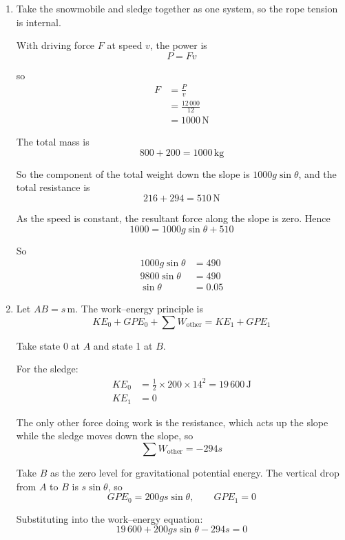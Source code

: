 \documentclass[leqno]{article}
\begin{document}
\begin{enumerate}[
  label=\textbf{\arabic*.},
  leftmargin=*,
  topsep=0pt,
  partopsep=0pt,
  parsep=0pt
]
\begin{djsSolution}
\begin{enumerate}[label=\textbf{(\alph*)}, start=1]
  \item Take the snowmobile and sledge together as one system, so the rope tension is internal.

  With driving force \(F\) at speed \(v\), the power is
  \[
  P=Fv
  \]

  so
  \begin{align*}
  F &= \frac{P}{v} \\
    &= \frac{12\,000}{12} \\
    &= 1000\,\mathrm{N}
  \end{align*}

  The total mass is
  \[
  800 + 200 = 1000\,\mathrm{kg}
  \]

  So the component of the total weight down the slope is \(1000g\sin\theta\), and the total resistance is
  \[
  216 + 294 = 510\,\mathrm{N}
  \]

  As the speed is constant, the resultant force along the slope is zero. Hence
  \[
  1000 = 1000g\sin\theta + 510
  \]

  So
  \begin{align*}
  1000g\sin\theta &= 490 \\
  9800\sin\theta &= 490 \\
  \sin\theta &= 0.05
  \end{align*}

  \item Let \(AB = s\,\mathrm{m}\). The work--energy principle is
  \[
  KE_0 + GPE_0 + \sum W_{\text{other}} = KE_1 + GPE_1
  \]

  Take state 0 at \(A\) and state 1 at \(B\).

  For the sledge:
  \begin{align*}
  KE_0 &= \tfrac12 \times 200 \times 14^2 = 19\,600\,\mathrm{J} \\
  KE_1 &= 0
  \end{align*}

  The only other force doing work is the resistance, which acts up the slope while the sledge moves down the slope, so
  \[
  \sum W_{\text{other}} = -294s
  \]

  Take \(B\) as the zero level for gravitational potential energy. The vertical drop from \(A\) to \(B\) is \(s\sin\theta\), so
  \[
  GPE_0 = 200gs\sin\theta,\qquad GPE_1 = 0
  \]

  Substituting into the work--energy equation:
  \[
  19\,600 + 200gs\sin\theta - 294s = 0
  \]


\end{enumerate}
\end{djsSolution}
\end{enumerate}
\end{document}
